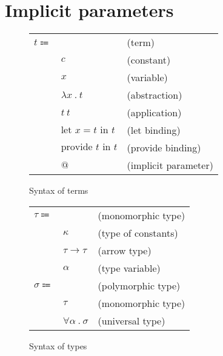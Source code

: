 \documentclass[acmlarge]{acmart}
\begin{document}
\section{Implicit parameters}

  \newcommand\entails[2]{#1 \vdash #2}
  \newcommand\hastype[2]{#1 : #2}
  \newcommand\evalsto[2]{#1 \longrightarrow #2}
  \newcommand\freevars[1]{\text{free} \left( #1 \right)}
  \newcommand\generalize[1]{\overline{\Gamma}\left( #1 \right)}
  \newcommand\sub[3]{#1 \left[ #2 \mapsto #3 \right]}

  \newcommand\labs[2]{\lambda #1 \ . \ #2}
  \newcommand\app[2]{#1 \ #2}
  \newcommand\llet[3]{\text{let } #1 = #2 \text{ in } #3}
  \newcommand\provide[2]{\text{provide } #1 \text{ in } #2}

  \newcommand\larrow[2]{#1 \rightarrow #2}
  \newcommand\lcontextarrow[3]{#1 \Rightarrow #2 \rightarrow #3}
  \newcommand\tabs[2]{\forall #1 \ . \ #2}

  \begin{figure}[h!]
    \begin{mdframed}

      \begin{tabular}{l l l}
        $t \Coloneqq $ & & (term) \\
        & $c$ & (constant) \\
        & $x$ & (variable) \\
        & $\labs{x}{t}$ & (abstraction) \\
        & $\app{t}{t}$ & (application) \\
        & $\llet{x}{t}{t}$ & (let binding) \\
        & $\provide{t}{t}$ & (provide binding) \\
        & $@$ & (implicit parameter)
      \end{tabular}

    \end{mdframed}
    \caption{Syntax of terms}
    \label{fig:terms_syntax}
  \end{figure}

  \begin{figure}[h!]
    \begin{mdframed}

      \begin{tabular}{l l l}
        $\tau \Coloneqq $ & & (monomorphic type) \\
        & $\kappa$ & (type of constants) \\
        & $\larrow{\tau}{\tau}$ & (arrow type) \\
        & $\alpha$ & (type variable) \\
        $\sigma \Coloneqq $ & & (polymorphic type) \\
        & $\tau$ & (monomorphic type) \\
        & $\tabs{\alpha}{\sigma}$ & (universal type)
      \end{tabular}

    \end{mdframed}
    \caption{Syntax of types}
    \label{fig:types_syntax}
  \end{figure}
\end{document}
